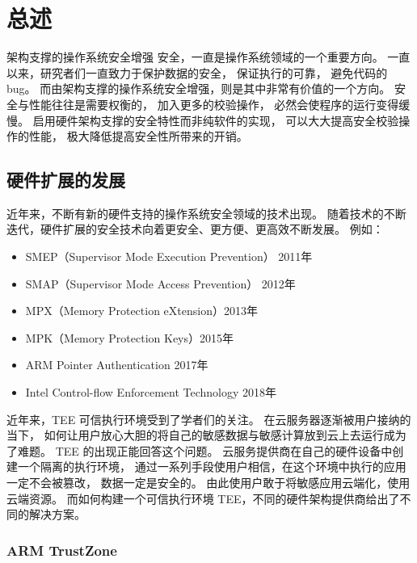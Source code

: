 \chapter{总述} %

\label{Chapter1} %

架构支撑的操作系统安全增强
安全，一直是操作系统领域的一个重要方向。
一直以来，研究者们一直致力于保护数据的安全，
保证执行的可靠，
避免代码的 bug。
而由架构支撑的操作系统安全增强，则是其中非常有价值的一个方向。
安全与性能往往是需要权衡的，
加入更多的校验操作，
必然会使程序的运行变得缓慢。
启用硬件架构支撑的安全特性而非纯软件的实现，
可以大大提高安全校验操作的性能，
极大降低提高安全性所带来的开销。

\section{硬件扩展的发展}
近年来，不断有新的硬件支持的操作系统安全领域的技术出现。
随着技术的不断迭代，硬件扩展的安全技术向着更安全、更方便、更高效不断发展。
例如：
\begin{itemize}
    \item SMEP（Supervisor Mode Execution Prevention） 2011年
    \item SMAP（Supervisor Mode Access Prevention） 2012年
    \item MPX（Memory Protection eXtension）2013年
    \item MPK（Memory Protection Keys）2015年
    \item ARM Pointer Authentication 2017年
    \item Intel Control-flow Enforcement Technology 2018年
\end{itemize}
近年来，TEE 可信执行环境受到了学者们的关注。
在云服务器逐渐被用户接纳的当下，
如何让用户放心大胆的将自己的敏感数据与敏感计算放到云上去运行成为了难题。
TEE 的出现正能回答这个问题。
云服务提供商在自己的硬件设备中创建一个隔离的执行环境，
通过一系列手段使用户相信，在这个环境中执行的应用一定不会被篡改，
数据一定是安全的。
由此使用户敢于将敏感应用云端化，使用云端资源。
而如何构建一个可信执行环境 TEE，不同的硬件架构提供商给出了不同的解决方案。

\subsection{ARM TrustZone}
